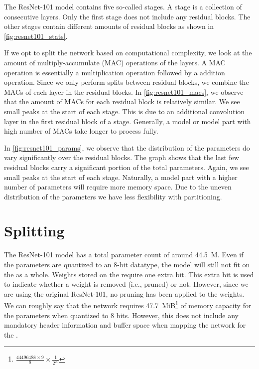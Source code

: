 The ResNet-101 model contains five so-called stages.
A stage is a collection of consecutive layers.
Only the first stage does not include any residual blocks.
The other stages contain different amounts of residual blocks as shown in \cref{fig:resnet101_stats}.

If we opt to split the network based on computational complexity, we look at the amount of multiply-accumulate (MAC) operations of the layers.
A MAC operation is essentially a multiplication operation followed by a addition operation.
Since we only perform splits between residual blocks, we combine the MACs of each layer in the residual blocks.
In \cref{fig:resnet101_macs}, we observe that the amount of MACs for each residual block is relatively similar.
We see small peaks at the start of each stage.
This is due to an additional convolution layer in the first residual block of a stage.
Generally, a model or model part with high number of MACs take longer to process fully.

In \cref{fig:resnet101_params}, we observe that the distribution of the parameters do vary significantly over the residual blocks.
The graph shows that the last few residual blocks carry a significant portion of the total parameters.
Again, we see small peaks at the start of each stage.
Naturally, a model part with a higher number of parameters will require more memory space.
Due to the uneven distribution of the parameters we have less flexibility with partitioning. 

\section{Splitting}
The ResNet-101 model has a total parameter count of around \SI{44.5}{M}.
Even if the parameters are quantized to an 8-bit datatype, the model will still not fit on the \graicore{} as a whole.
Weights stored on the \graicore{} require one extra bit.
This extra bit is used to indicate whether a weight is removed (i.e., pruned) or not.
However, since we are using the original ResNet-101, no pruning has been applied to the weights.
We can roughly say that the network requires \SI{47.7}{MiB}\footnote{$\frac{\num{44496488} \times 9}{8} \times \frac{1}{2^{20}}$} of memory capacity for the parameters when quantized to 8 bits.
However, this does not include any mandatory header information and buffer space when mapping the network for the \graicore{}. 

